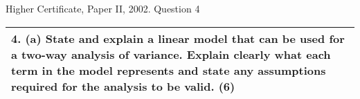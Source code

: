 \documentclass[a4paper,12pt]{article}
\begin{document}
Higher Certificate, Paper II, 2002.  Question 4 

\begin{table}[ht!]
 
\centering
 
\begin{tabular}{|p{15cm}|}
 
\hline  


4. (a) State and explain a linear model that can be used for a two-way analysis of variance.  Explain clearly what each term in the model represents and state any assumptions required for the analysis to be valid.  (6) 

\\ \hline
  
\end{tabular}

\end{table}
\end{document}
